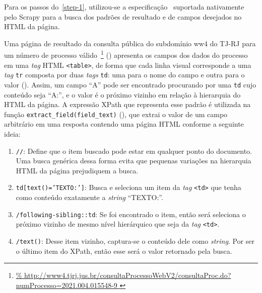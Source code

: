 Para os passos do~\cref{step-1}, utilizou-se a especificação~\cite{spec:xpath}
suportada nativamente pelo Scrapy para a busca dos padrões de resultado e de
campos desejados no HTML da página.


\newcommand{\urlProcValido}{\url{%
    http://www4.tjrj.jus.br/consultaProcessoWebV2/consultaProc.do?numProcesso=2021.004.015548-9
}}

Uma página de resultado da consulta pública do subdomínio ww4 do TJ-RJ para um
número de processo válido~\footnote{\urlProcValido}
() apresenta os campos dos dados do processo em
uma \textit{tag} HTML \texttt{<table>}, de forma que cada linha visual
corresponde a uma \textit{tag} \texttt{tr} composta por duas \textit{tags}
\texttt{td}: uma para o nome do campo e outra para o valor
(). Assim, um campo ``A'' pode ser encontrado procurando
por uma \texttt{td} cujo conteúdo seja ``A:'', e o valor é o próximo vizinho em
relação à hierarquia do HTML da página. A expressão XPath que representa esse
padrão é utilizada na função \texttt{extract_field(field_text)}
(), que extrai o valor de um campo arbitrário em uma
resposta contendo uma página HTML conforme a seguinte ideia:

\begin{enumerate}
    \item \texttt{//}: Define que o item buscado pode estar em qualquer ponto
        do documento. Uma busca genérica dessa forma evita que pequenas
        variações na hierarquia HTML da página prejudiquem a busca.
    \item \texttt{td[text()='TEXTO:']}: Busca e seleciona um item da
        \textit{tag} \texttt{<td>} que tenha como conteúdo exatamente a
        \textit{string} ``TEXTO:''.
    \item \texttt{/following-sibling::td}: Se foi encontrado o item, então será
        seleciona o próximo vizinho de mesmo nível hierárquico que seja da
        \textit{tag} \texttt{<td>}.
    \item \texttt{/text()}: Desse item vizinho, captura-se o conteúdo dele como
        \textit{string}. Por ser o último item do XPath, então esse será o
        valor retornado pela busca.
\end{enumerate}


